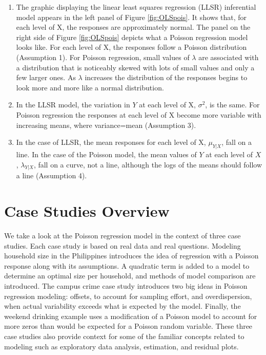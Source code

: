 \documentclass[
]{krantz}
\providecommand{\tightlist}{%
  \setlength{\itemsep}{0pt}\setlength{\parskip}{0pt}}
\begin{document}
\begin{enumerate}
\def\labelenumi{\arabic{enumi}.}
\tightlist
\item
  The graphic displaying the linear least squares regression (LLSR) inferential model appears in the left panel of Figure \ref{fig:OLSpois}. It shows that, for each level of X, the responses are approximately normal. The panel on the right side of Figure \ref{fig:OLSpois} depicts what a Poisson regression model looks like. For each level of X, the responses follow a Poisson distribution (Assumption 1). For Poisson regression, small values of \(\lambda\) are associated with a distribution that is noticeably skewed with lots of small values and only a few larger ones. As \(\lambda\) increases the distribution of the responses begins to look more and more like a normal distribution.
\item
  In the LLSR model, the variation in \(Y\) at each level of X, \(\sigma^2\), is the same. For Poisson regression the responses at each level of X become more variable with increasing means, where variance=mean (Assumption 3).
\item
  In the case of LLSR, the mean responses for each level of X, \(\mu_{Y|X}\), fall on a line. In the case of the Poisson model, the mean values of \(Y\) at each level of \(X\), \(\lambda_{Y|X}\), fall on a curve, not a line, although the logs of the means should follow a line (Assumption 4).
\end{enumerate}

\hypertarget{case-studies-overview}{%
\section{Case Studies Overview}\label{case-studies-overview}}

We take a look at the Poisson regression model in the context of three case studies. Each case study is based on real data and real questions. Modeling household size in the Philippines introduces the idea of regression with a Poisson response along with its assumptions. A quadratic term is added to a model to determine an optimal size per household, and methods of model comparison are introduced. The campus crime case study introduces two big ideas in Poisson regression modeling: offsets, to account for sampling effort, and overdispersion, when actual variability exceeds what is expected by the model. Finally, the weekend drinking example uses a modification of a Poisson model to account for more zeros than would be expected for a Poisson random variable. These three case studies also provide context for some of the familiar concepts related to modeling such as exploratory data analysis, estimation, and residual plots.
\end{document}
